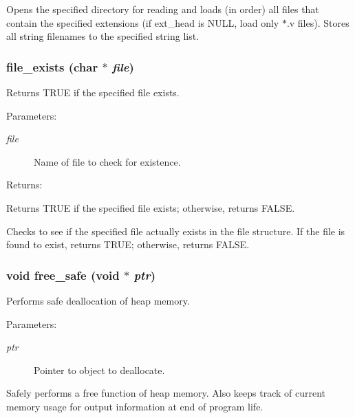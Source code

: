 Opens the specified directory for reading and loads (in order) all files that contain the specified extensions (if ext\_\-head is NULL, load only $\ast$.v files). Stores all string filenames to the specified string list. 
\subsubsection{ file\_\-exists (char $\ast$ {\em file})}\label{util_8h_a7}


Returns TRUE if the specified file exists.

\begin{Desc}
\item[Parameters: ]\par
\begin{description}
\item[{\em 
file}]Name of file to check for existence. \end{description}
\end{Desc}
\begin{Desc}
\item[Returns: ]\par
Returns TRUE if the specified file exists; otherwise, returns FALSE.\end{Desc}
Checks to see if the specified file actually exists in the file structure. If the file is found to exist, returns TRUE; otherwise, returns FALSE. 
\subsubsection{\setlength{\rightskip}{0pt plus 5cm}void free\_\-safe (void $\ast$ {\em ptr})}\label{util_8h_a13}


Performs safe deallocation of heap memory.

\begin{Desc}
\item[Parameters: ]\par
\begin{description}
\item[{\em 
ptr}]Pointer to object to deallocate.\end{description}
\end{Desc}
Safely performs a free function of heap memory. Also keeps track of current memory usage for output information at end of program life. 
